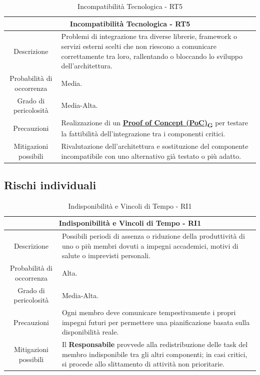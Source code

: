 \documentclass[12pt, a4paper]{article}
\newcommand{\urlglossario}{https://skynetunigroup.github.io/Code_Guardian/Documentazione/PB/glossario_v2.0.0.pdf} %
\newcommand{\glo}[2]{\href{\urlglossario\#nameddest=#2}{#1\textsubscript{G}}}
\begin{document}
\begin{table}[H]
    \centering
    \renewcommand{\arraystretch}{1.3}
    \begin{tabularx}{\textwidth}{|c|X|}
        \hline
        \multicolumn{2}{|c|}{\textbf{Incompatibilità Tecnologica - RT5}} \\ \hline
        Descrizione &
        Problemi di integrazione tra diverse librerie, framework o servizi
        esterni scelti che non riescono a comunicare correttamente tra loro,
        rallentando o bloccando lo sviluppo dell'architettura.
\\ \hline
        Probabilità di occorrenza & Media.
\\ \hline
        Grado di pericolosità & Media-Alta.
\\ \hline
        Precauzioni &
        Realizzazione di un \textbf{\glo{Proof of Concept (PoC)}{poc}} per testare la fattibilità dell'integrazione tra i componenti critici.
\\ \hline
        Mitigazioni possibili &
        Rivalutazione dell'architettura e sostituzione del componente incompatibile con uno alternativo già testato o più adatto.\\ \hline
    \end{tabularx}
    \caption{Incompatibilità Tecnologica - RT5}
\end{table}


\subsection{Rischi individuali}

\begin{table}[H]
    \centering
    \renewcommand{\arraystretch}{1.3}
    \begin{tabularx}{\textwidth}{|c|X|}
        \hline
        \multicolumn{2}{|c|}{\textbf{Indisponibilità e Vincoli di Tempo - RI1}} \\ \hline
        Descrizione &
 
        Possibili periodi di assenza o riduzione della produttività di uno o più
        membri dovuti a impegni accademici, motivi di salute o imprevisti
        personali.
\\ \hline
        Probabilità di occorrenza & Alta.
\\ \hline
        Grado di pericolosità & Media-Alta.
\\ \hline
        Precauzioni &
        Ogni membro deve comunicare tempestivamente i propri impegni futuri per
        permettere una pianificazione basata sulla disponibilità reale.
\\ \hline
        Mitigazioni possibili &
        Il \textbf{Responsabile} provvede alla redistribuzione delle task del membro
        indisponibile tra gli altri componenti;
in casi critici, si procede allo
        slittamento di attività non prioritarie.\\ \hline
    \end{tabularx}
    \caption{Indisponibilità e Vincoli di Tempo - RI1}
\end{table}
\end{document}
